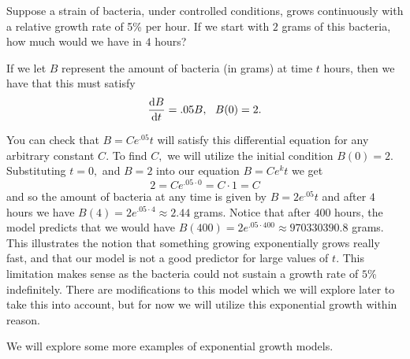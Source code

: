 \begin{myexample}
  Suppose a strain of bacteria, under controlled conditions, grows
  continuously with a relative growth rate of 5\% per hour.  If we
  start with $2$ grams of this bacteria, how much would we have in $4$ 
  hours?

    If we let $B$ represent the amount of bacteria (in grams) at
    time $t$ hours, then we have that this must satisfy 
    $$
    \frac{\text{d}{B}}{\text{d}{t}}=.05 B, \ \     B(0)=2.
    $$

    You can check that $B=Ce^.05t$ will satisfy this differential
    equation for any arbitrary constant $C.$  To find $C,$ we will utilize
    the initial condition $B(0)=2.$  Substituting $t=0,$ and  $B=2$ into our
    equation $B=Ce^kt$ we get
    $$
    2=Ce^{.05\cdot0}=C\cdot1=C
    $$
    and so the amount of bacteria at any time is given by $B=2e^.05t$ 
    and after $4$ hours we have $B(4)=2e^{.05\cdot4}\approx 2.44$ grams.  Notice that
    after $400$ hours, the model predicts that we would have
    $B(400)=2e^{.05\cdot400}\approx 970330390.8$ grams.  This illustrates the
    notion that something growing exponentially grows really fast, and
    that our model is not a good predictor for large values of $t.$ 
    This limitation makes sense as the bacteria could not sustain a
    growth rate of $5$\% indefinitely.  There are modifications to this
    model which we will explore later to take this into account, but
    for now we will utilize this exponential growth within reason.
  \end{myexample}
  
We will explore some more examples of exponential growth models.

